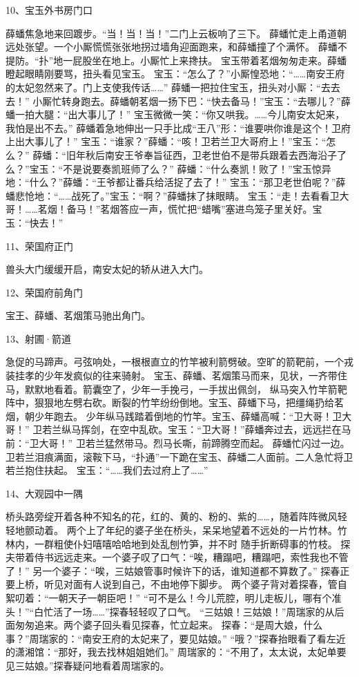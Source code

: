 10、宝玉外书房门口\par
薛蟠焦急地来回踱步。“当！当！当！”二门上云板响了三下。
薛蟠忙走上甬道朝远处张望。一个小厮慌慌张张地拐过墙角迎面跑来，和薛蟠撞了个满怀。
薛蟠不提防。“扑”地一屁股坐在地上。小厮忙上来搀扶。
宝玉带着茗烟匆匆走来。薛蟠瞪起眼睛刚要骂，扭头看见宝玉。
宝玉：“怎么了？”小厮惶恐地：“……南安王府的太妃忽然来了。门上支使我传话……”
薛蟠一把拉住宝玉，扭头对小厮：“去去去！”
小厮忙转身跑去。薛蟠朝茗烟一扬下巴：“快去备马！”宝玉：“去哪儿？”薛蟠一拍大腿：“出大事儿了！”
宝玉微微一笑：“你又哄我。……今儿南安太妃来，我怕是出不去。”
薛蟠着急地伸出一只手比成“王八”形：“谁要哄你谁是这个！卫府上出大事儿了！”
宝玉：“谁家？”薛蟠：“咳！卫若兰卫大哥府上！”宝玉：“怎么？”
薛蟠：“旧年秋后南安王爷奉旨征西，卫老世伯不是带兵跟着去西海沿子了么？”宝玉：“不是说要奏凯班师了么？”
薛蟠：“什么奏凯！败了！”宝玉惊异地：“什么？”薛蟠：“王爷都让番兵给活捉了去了！”
宝玉：“那卫老世伯呢？”薛蟠悲怆地：“……战死了。”宝玉：“啊？”薛蟠抹了抹眼睛。
宝玉：“走！去看看卫大哥！……茗烟！备马！”茗烟答应一声，慌忙把“蜡嘴”塞进鸟笼子里关好。宝玉：“快去！”

11、荣国府正门\par
兽头大门缓缓开启，南安太妃的轿从进入大门。

12、荣国府前角门\par
宝王、薛蟠、茗烟策马驰出角门。

13、射圃·箭道\par
急促的马蹄声。弓弦响处，一根根直立的竹竿被利箭劈破。空旷的箭靶前，一个戎装挂孝的少年发疯似的往来骑射。
宝玉、薛蟠、茗烟策马而来，见状，一齐带住马，默默地看着。箭囊空了，少年一手挽弓，一手拔出佩剑，
纵马突入竹竿箭靶阵中，狠狠地左劈右砍。断裂的竹竿纷纷倒地。宝玉、薛蟠下马，把缰绳扔给茗烟，朝少年跑去。
少年纵马践踏着倒地的竹竿。宝玉、薛蟠高喊：“卫大哥！卫大哥！”
卫若兰纵马挥剑，在空中乱砍。宝玉：“卫大哥！”薛蟠奔过去，远远拦在马前：“卫大哥！”
卫若兰猛然带马。烈马长嘶，前蹄腾空而起。
薛蟠忙闪过一边。卫若兰泪痕满面，滚鞍下马，“扑通”一下跪在宝玉、薛蟠二人面前。二人急忙将卫若兰抱住扶起。
宝玉：“……我们去过府上了……”

14、大观园中一隅\par
桥头路旁绽开着各种不知名的花，红的、黄的、粉的、紫的……，随着阵阵微风轻轻地颤动着。
两个上了年纪的婆子坐在桥头，呆呆地望着不远处的一片竹林。竹林内，一群粗使仆妇嘻嘻哈哈地到处乱刨竹笋，并不时
随手折断碍事的竹枝。
探夫带着侍书远远走来。一个婆子叹了口气：“唉，糟蹋吧，糟蹋吧，索性我也不管了！”
另一个婆子：“唉，三姑娘管事时候许下的话，谁知道都不算数了。”
探春正要上桥，听见对面有人说到自己，不由地停下脚步。
两个婆子背对着探春，管自絮叨着：“一朝天子一朝臣吧！”
“可不是么！今儿荒腔，明儿走板儿，哪有个准头！”“白忙活了一场……”探春轻轻叹了口气。
“三姑娘！三姑娘！”周瑞家的从后面匆匆追来。两个婆子回头看见探春，忙立起来。
探春：“是周大娘，什么事？”周瑞家的：“南安王府的太妃来了，要见姑娘。”
“哦？”探春抬眼看了看左近的潇湘馆：“那好，我去找林姐姐她们。”
周瑞家的：“不用了，太太说，太妃单要见三姑娘。”探春疑问地看着周瑞家的。

